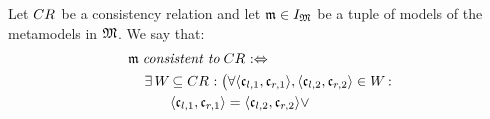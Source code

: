 \begin{definition}[Consistency] \label{def:consistency}
    Let $\consistencyrelation{CR}{}$ be a consistency relation %
    and let $\modeltuple{m} \in \metamodeltupleinstanceset{M}$ %
    be a tuple of models of the metamodels in $\metamodeltuple{M}$.
    We say that:
     \begin{align*}
        & 
        \modeltuple{m} \consistenttomath \consistencyrelation{CR}{} \equivalentperdefinition \\
        & \formulaskip
        \exists \consistencyrelation{W}{} \subseteq \consistencyrelation{CR}{} : 
        \bigl( \forall \tupled{\conditionelement{c}{l,1}, \conditionelement{c}{r,1}}, \tupled{\conditionelement{c}{l,2}, \conditionelement{c}{r,2}} \in \consistencyrelation{W}{} : \\
        & \formulaskip\formulaskip\formulaskip
        \tupled{\conditionelement{c}{l,1}, \conditionelement{c}{r,1}} = \tupled{\conditionelement{c}{l,2}, \conditionelement{c}{r,2}} \lor 

\end{align*}
\end{definition}
